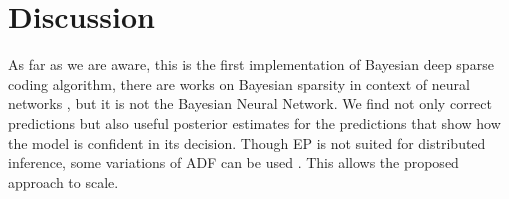 \documentclass[letterpaper]{article}
\begin{document}
\section{Discussion}
As far as we are aware, this is the first implementation of Bayesian deep sparse coding algorithm, there are works on Bayesian sparsity in context of neural networks \cite{he2017bayesian}, but it is not the Bayesian Neural Network. We find not only correct predictions but also useful posterior estimates for the predictions that show how the model is confident in its decision. 
Though EP is not suited for distributed inference, some variations of ADF can be used \cite{li2015stochastic}. This allows the proposed approach to scale.



\end{document}
